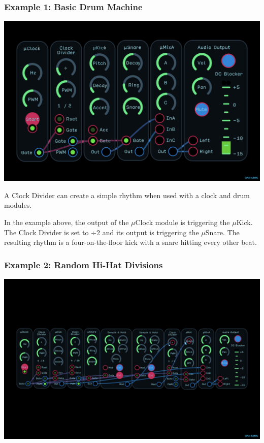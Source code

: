 \documentclass[11pt]{book}
\begin{document}
\begin{multicols*}{2}
\subsubsection*{Example 1: Basic Drum Machine}

\begin{center}
\includegraphics[width=0.95\linewidth]{clock-divider-fig7.png}
\end{center}

A Clock Divider can create a simple rhythm when used with a clock and drum modules. 

In the example above, the output of the $\mu$Clock module is triggering the $\mu$Kick. The Clock Divider is set to $\div$2 and its output is triggering the $\mu$Snare. The resulting rhythm is a four-on-the-floor kick with a snare hitting every other beat.

\subsubsection*{Example 2: Random Hi-Hat Divisions}

\begin{center}
\includegraphics[width=0.95\linewidth]{clock-divider-fig8.png}
\end{center}


\end{multicols*}
\end{document}
